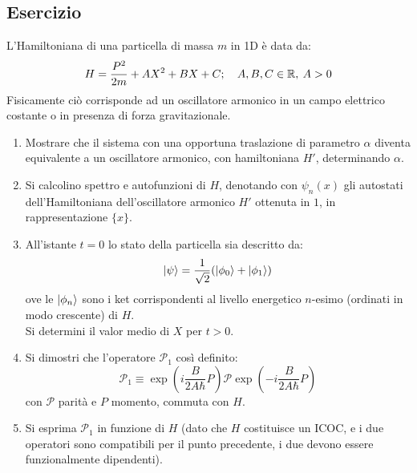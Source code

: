 \documentclass[../../FisicaTeorica.tex]{subfiles}
\begin{document}
\subsection{Esercizio \theEsercizio}
L'Hamiltoniana di una particella di massa $m$ in 1D è data da:
\[
H=\frac{P^2}{2m} + AX^2 + BX + C; \quad A,B,C \in \mathbb{R}, \> A > 0
\]
Fisicamente ciò corrisponde ad un oscillatore armonico in un campo elettrico costante o in presenza di forza gravitazionale.
\begin{enumerate}
\item Mostrare che il sistema con una opportuna traslazione di parametro $\alpha$ diventa equivalente a un oscillatore armonico, con hamiltoniana $H'$, determinando $\alpha$.
\item Si calcolino spettro e autofunzioni di $H$, denotando con $\psi_n(x)$ gli autostati dell'Hamiltoniana dell'oscillatore armonico $H'$ ottenuta in $1$, in rappresentazione $\{x\}$.
\item All'istante $t=0$ lo stato della particella sia descritto da:
\[
\Ket{\psi}=\frac{1}{\sqrt{2}}(\Ket{\phi_0}+\Ket{\phi_1})
\]
ove le $\Ket{\phi_n}$ sono i ket corrispondenti al livello energetico $n$-esimo (ordinati in modo crescente) di $H$.\\
Si determini il valor medio di $X$ per $t>0$.
\item Si dimostri che l'operatore $\mathcal{P}_1$ così definito:
\[
\mathcal{P}_1 \equiv \exp\left(i\frac{B}{2A\hbar}P\right) \mathcal{P} \exp\left(-i\frac{B}{2A\hbar}P\right)
\]
con $\mathcal{P}$ parità e $P$ momento, commuta con $H$.
\item Si esprima $\mathcal{P}_1$ in funzione di $H$ (dato che $H$ costituisce un ICOC, e i due operatori sono compatibili per il punto precedente, i due devono essere funzionalmente dipendenti).
\end{enumerate}
\end{document}
